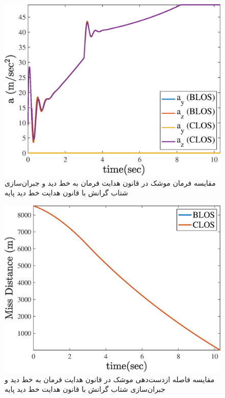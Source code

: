 \begin{figure}[H]
	\centering
	\includegraphics[width=.75\linewidth]{../Figure/h/command}
	\caption{مقایسه فرمان موشک در قانون هدایت فرمان به خط دید و جبران‌سازی شتاب گرانش با قانون هدایت خط دید پایه }
\end{figure}

\begin{figure}[H]
	\centering
	\includegraphics[width=.75\linewidth]{../Figure/h/miss_distance}
	\caption{مقایسه فاصله ازدست‌دهی موشک در قانون هدایت فرمان به خط دید و جبران‌سازی شتاب گرانش با قانون هدایت خط دید پایه }
\end{figure}
